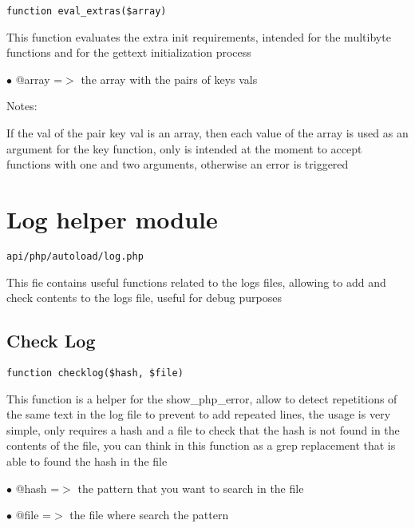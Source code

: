 \documentclass[a4paper]{book}
\begin{document}
\begin{lstlisting}
function eval_extras($array)
\end{lstlisting}

This function evaluates the extra init requirements, intended for the multibyte
functions and for the gettext initialization process

\begin{compactitem}
\item[\color{myblue}$\bullet$] @array =$>$ the array with the pairs of keys vals
\end{compactitem}

Notes:

If the val of the pair key val is an array, then each value of the array is
used as an argument for the key function, only is intended at the moment to
accept functions with one and two arguments, otherwise an error is triggered

\hypertarget{toc194}{}
\section{Log helper module}

\begin{lstlisting}
api/php/autoload/log.php
\end{lstlisting}

This fie contains useful functions related to the logs files, allowing to add and check contents
to the logs file, useful for debug purposes

\hypertarget{toc195}{}
\subsection{Check Log}

\begin{lstlisting}
function checklog($hash, $file)
\end{lstlisting}

This function is a helper for the show\_php\_error, allow to detect repetitions
of the same text in the log file to prevent to add repeated lines, the usage
is very simple, only requires a hash and a file to check that the hash is not
found in the contents of the file, you can think in this function as a grep
replacement that is able to found the hash in the file

\begin{compactitem}
\item[\color{myblue}$\bullet$] @hash =$>$ the pattern that you want to search in the file
\item[\color{myblue}$\bullet$] @file =$>$ the file where search the pattern
\end{compactitem}
\end{document}
